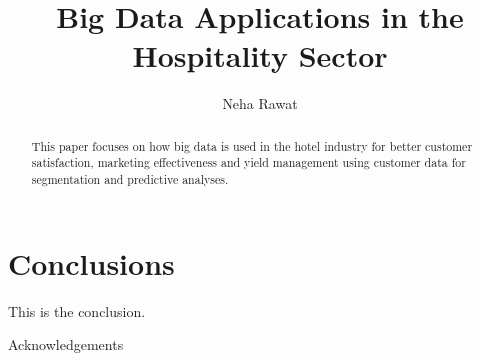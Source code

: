 \documentclass[sigconf]{acmart}
\begin{document}
\title{Big Data Applications in the Hospitality Sector}


\author{Neha Rawat}



\renewcommand{\shortauthors}{N. Rawat}


\begin{abstract}
This paper focuses on how big data is used in the hotel industry for better customer satisfaction, marketing effectiveness and yield management using customer data for segmentation and predictive analyses.  
\end{abstract}

\maketitle
\section{Conclusions}

This is the conclusion.\cite{gregor2017}


\begin{acks}

Acknowledgements

\end{acks}


 
\end{document}
